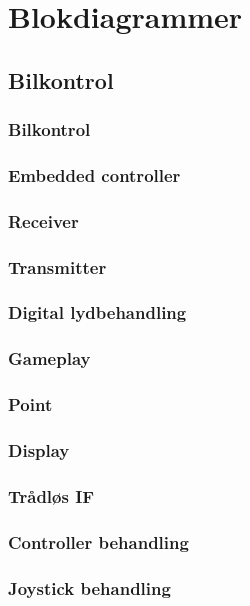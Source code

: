 \section{Blokdiagrammer}

\subsection{Bilkontrol}

\subsubsection*{Bilkontrol}
\subsubsection*{Embedded controller}
\subsubsection*{Receiver}
\subsubsection*{Transmitter}
\subsubsection*{Digital lydbehandling}
\subsubsection*{Gameplay}
\subsubsection*{Point}
\subsubsection*{Display}
\subsubsection*{Trådløs IF}
\subsubsection*{Controller behandling}
\subsubsection*{Joystick behandling}

